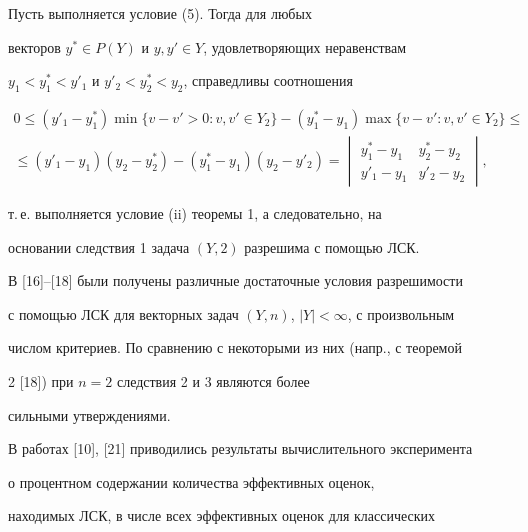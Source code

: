  


\begin{pf} Пусть выполняется условие (5). Тогда для любых 


векторов $y^*\in P(Y)$ и $y,y'\in Y$, удовлетворяющих неравенствам 


$y_1<y^*_1<y'_1$ и $y'_2<y^*_2<y_2$, справедливы соотношения 


\begin{multline*} 


0\le(y'_1-y^*_1)\min\{v-v'>0:v,v'\in Y_2\}- 


(y^*_1-y_1)\max\{v-v':v,v'\in Y_2\}\le \\ 


% 


\le(y'_1-y_1)(y_2-y^*_2)-(y^*_1-y_1)(y_2-y'_2)= 


\begin{vmatrix} 


y^*_1-y_1 & y^*_2-y_2 \\ y'_1-y_1 & y'_2-y_2 


\end{vmatrix} 


, 


\end{multline*} 


т.\,е. выполняется условие (ii) теоремы 1, а следовательно, на 


основании следствия 1 задача $(Y,2)$ разрешима с помощью ЛСК. 


\end{pf} 


 


В [16]--[18] были получены различные достаточные условия разрешимости 


с помощью ЛСК для векторных задач $(Y,n)$, $|Y|<\infty$, с произвольным 


числом критериев. По сравнению с некоторыми из них (напр., с теоремой 


2 [18]) при $n=2$ следствия 2 и 3 являются более 


сильными утверждениями. 


 


В работах [10], [21] приводились результаты вычислительного эксперимента 


о процентном содержании количества эффективных оценок, 


находимых ЛСК, в числе всех эффективных оценок для классических 


